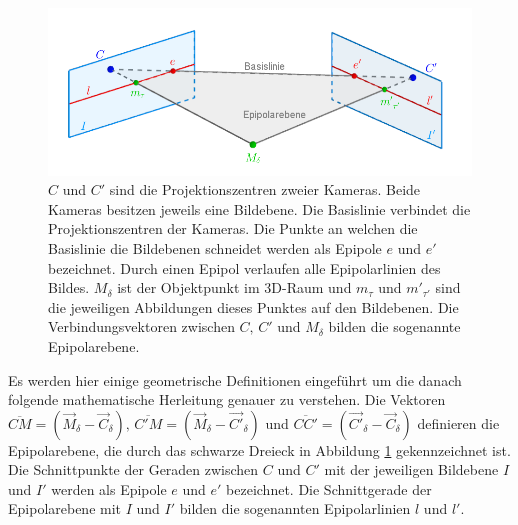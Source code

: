 \begin{figure}[!htb]
	\centering
	\includegraphics[width=.8\linewidth]{images/EpipolarGeoemtrieGrafik_beschriftet.png}
	\caption[Epipolargeometrie]{$C$ und $C'$ sind die Projektionszentren zweier Kameras. Beide Kameras besitzen jeweils eine Bildebene. Die Basislinie verbindet die Projektionszentren der Kameras. Die Punkte an welchen die Basislinie die Bildebenen schneidet werden als Epipole $e$ und $e'$ bezeichnet. Durch einen Epipol verlaufen alle Epipolarlinien des Bildes. $M_\delta$ ist der Objektpunkt im 3D-Raum und $m_\tau$ und $m'_{\tau'}$ sind die jeweiligen Abbildungen dieses Punktes auf den Bildebenen. Die Verbindungsvektoren zwischen $C,\, C'$ und $M_\delta$ bilden die sogenannte Epipolarebene\cite{Hoffmann,phdTwoView,HZ,ZZGXr}.}  
	\label{fig:Epipolargeometry}
\end{figure}



Es werden hier einige geometrische Definitionen eingeführt um die danach folgende mathematische Herleitung genauer zu verstehen. Die Vektoren $\overline{CM} = (\overrightarrow{M}_\delta - \overrightarrow{C}_\delta),\, \overline{C'M} = (\overrightarrow{M}_\delta - \overrightarrow{C'}_\delta)$ und $\overline{CC'} = (\overrightarrow{C'}_\delta - \overrightarrow{C}_\delta)$ definieren die Epipolarebene, die durch das schwarze Dreieck in Abbildung \ref{fig:Epipolargeometry} gekennzeichnet ist. Die Schnittpunkte der Geraden zwischen $C$ und $C'$ mit der jeweiligen Bildebene $I$ und $I'$ werden als Epipole $e$ und $e'$ bezeichnet. Die Schnittgerade der Epipolarebene mit $I$ und $I'$ bilden die sogenannten Epipolarlinien $l$ und $l'$\cite{HZ,Zhang2014,ZZPaper,phdTwoView,Elements}.\\%

